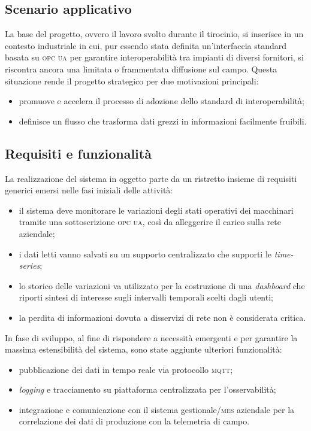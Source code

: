 \documentclass[12pt]{article}
\begin{document}
    \subsection{Scenario applicativo}
    
    La base del progetto, ovvero il lavoro svolto durante il tirocinio, si inserisce in un contesto industriale in cui, pur essendo stata definita un'interfaccia standard basata su \textsc{opc ua} per garantire interoperabilità tra impianti di diversi fornitori, si riscontra ancora una limitata o frammentata diffusione sul campo. Questa situazione rende il progetto strategico per due motivazioni principali:
    \begin{itemize}
        \item promuove e accelera il processo di adozione dello standard di interoperabilità;
        \item definisce un flusso che trasforma dati grezzi in informazioni facilmente fruibili.
    \end{itemize}
    
    \subsection{Requisiti e funzionalità}
    
    La realizzazione del sistema in oggetto parte da un ristretto insieme di requisiti generici emersi nelle fasi iniziali delle attività:
    \begin{itemize}
        \item il sistema deve monitorare le variazioni degli stati operativi dei macchinari tramite una sottoscrizione \textsc{opc ua}, così da alleggerire il carico sulla rete aziendale;
        \item i dati letti vanno salvati su un supporto centralizzato che supporti le \textit{time-series};
        \item lo storico delle variazioni va utilizzato per la costruzione di una \textit{dashboard} che riporti sintesi di interesse sugli intervalli temporali scelti dagli utenti;
        \item la perdita di informazioni dovuta a disservizi di rete non è considerata critica. 
    \end{itemize}
    
    In fase di sviluppo, al fine di rispondere a necessità emergenti e per garantire la massima estensibilità del sistema, sono state aggiunte ulteriori funzionalità:
    \begin{itemize}
        \item pubblicazione dei dati in tempo reale via protocollo \textsc{mqtt};
        \item \textit{logging} e tracciamento su piattaforma centralizzata per l'osservabilità;
        \item integrazione e comunicazione con il sistema gestionale/\textsc{mes} aziendale per la correlazione dei dati di produzione con la telemetria di campo.
    \end{itemize}
    
\end{document}
